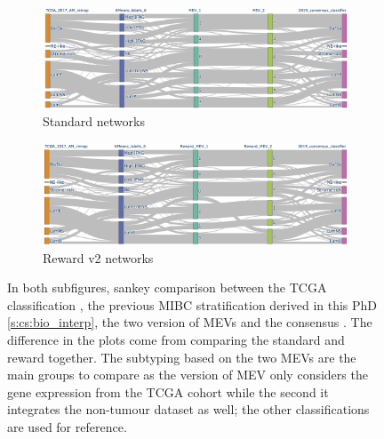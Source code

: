 \begin{figure}[!htb]
    \centering
    \begin{subfigure}{1.0\linewidth}
        \includegraphics[width=1.0\textwidth,keepaspectratio]{Sections/Network_II/validation/mevs_comp_std.png}
        \caption{Standard networks}
    \end{subfigure} %
    \centering
    \begin{subfigure}{1.0\linewidth}
        \includegraphics[width=1.0\textwidth,keepaspectratio]{Sections/Network_II/validation/mevs_comp_rwd.png}
        \caption{Reward v2 networks}
    \end{subfigure}
    \centering
    \caption{In both subfigures, sankey comparison between the TCGA classification \citet{Robertson2017-mg}, the previous MIBC stratification derived in this PhD \cref{s:cs:bio_interp}, the two version of MEVs and the consensus \citet{Kamoun2020-tj}. The difference in the plots come from comparing the standard and reward together. The subtyping based on the two MEVs are the main groups to compare as the version of MEV only considers the gene expression from the TCGA cohort while the second it integrates the non-tumour dataset as well; the other classifications are used for reference.}
    \label{fig:N_II:mevs_comp}
\end{figure}

